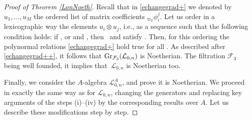 \documentclass[pdftex]{sigma}
\numberwithin{equation}{section}
\theoremstyle{definition}
\newcommand{\Ll}{{\mathcal L}}
\begin{document}
\begin{proof}[Proof of Theorem \ref{LonNoeth}]
Recall that in \eqref{echangegrad+} we denoted by $u_1,\dots,u_M$ the ordered list of matrix coefficients ${}_{\varpi_k}\phi_{i}^{j}$. Let us order in a lexicographic way the elements $u_i\otimes u_j$, i.e., as a sequence  such that the following condition holds: if , or  and , then~ and  satisfy . Then, for this ordering the polynormal relations \eqref{echangegrad+} hold true for all . As described after \eqref{echangegrad++}, it follows that ${\rm Gr}_{\mathcal{F}_3}(\Ll_{0,n})$ is Noetherian. The filtration $\mathcal{F}_3$ being well founded, it implies that~$\Ll_{0,n}$ is Noetherian too.

Finally, we consider the $A$-algebra $\Ll_{0,n}^A$, and prove it is Noetherian. We proceed in exactly the same way as for $\Ll_{0,n}$, changing the generators and replacing key arguments of the steps (i)--(iv) by the corresponding results over $A$. Let us describe these modifications step by step.


\end{proof}
\end{document}
